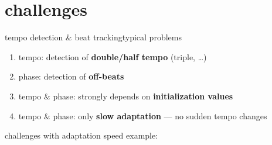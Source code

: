     \section{challenges}
        \begin{frame}{tempo detection \& beat tracking}{typical problems}
            \begin{enumerate}
                \item	tempo: detection of \textbf{double/half tempo} (triple, \ldots)
                \smallskip
                \item<1->	phase: detection of \textbf{off-beats}
                \smallskip
                \item<1->	tempo \& phase: strongly depends on \textbf{initialization values}
                \smallskip
                \item<1->	tempo \& phase: only \textbf{slow adaptation} --- no sudden tempo changes
            \end{enumerate}
            
            challenges with adaptation speed example:                     
        \end{frame}
    
